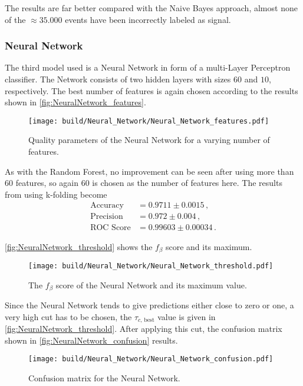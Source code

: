 The results are far better compared with the Naive Bayes approach, almost none of the
$\approx 35.000$ events have been incorrectly labeled as signal.

\subsubsection{Neural Network}

The third model used is a Neural Network in form of a multi-Layer Perceptron classifier.
The Network consists of two hidden layers with sizes $60$ and $10$, respectively.
The best number of features is again chosen according to the results shown in
\autoref{fig:NeuralNetwork_features}.

\begin{figure}[H]
  \centering
  \texttt{[image: build/Neural\_Network/Neural\_Network\_features.pdf]}
  \caption{Quality parameters of the Neural Network for a varying number of features.}
  \label{fig:NeuralNetwork_features}
\end{figure}

As with the Random Forest, no improvement can be seen after using more than
$60$ features, so again $60$ is chosen as the number of features here.
The results from using k-folding become
\begin{align*}
  \text{Accuracy} &= 0.9711\pm0.0015 \,, \\
  \text{Precision} &= 0.972\pm0.004 \,, \\
  \text{ROC Score} &= 0.99603\pm0.00034 \,.
\end{align*}

\autoref{fig:NeuralNetwork_threshold} shows the $f_\beta$ score and its maximum.

\begin{figure}[H]
  \centering
  \texttt{[image: build/Neural\_Network/Neural\_Network\_threshold.pdf]}
  \caption{The $f_\beta$ score of the Neural Network and its maximum value.}
  \label{fig:NeuralNetwork_threshold}
\end{figure}

Since the Neural Network tends to give predictions either close to zero or one,
a very high cut has to be chosen, the $\tau_{c \text{, best}}$ value is given in
\autoref{fig:NeuralNetwork_threshold}.
After applying this cut, the confusion matrix shown in \autoref{fig:NeuralNetwork_confusion}
results.

\begin{figure}[H]
  \centering
  \texttt{[image: build/Neural\_Network/Neural\_Network\_confusion.pdf]}
  \caption{Confusion matrix for the Neural Network.}
  \label{fig:NeuralNetwork_confusion}
\end{figure}


